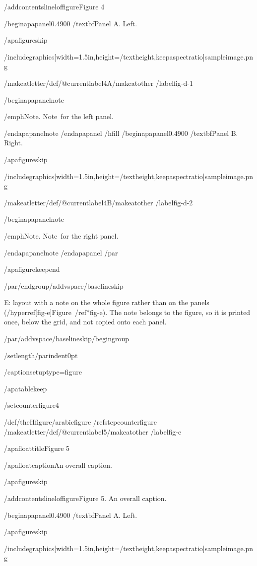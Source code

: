 /addcontentsline{lof}{figure}{Figure 4}

/begin{apapanel}{0.4900}%
/textbf{Panel A}. Left.

/apafigureskip

/includegraphics[width=1.5in,height=/textheight,keepaspectratio]{sampleimage.png}

/makeatletter/def/@currentlabel{4A}/makeatother%
/label{fig-d-1}

/begin{apapanelnote}

/emph{Note}. Note~for the left panel.

/end{apapanelnote}
/end{apapanel}%
/hfill
/begin{apapanel}{0.4900}%
/textbf{Panel B}. Right.

/apafigureskip

/includegraphics[width=1.5in,height=/textheight,keepaspectratio]{sampleimage.png}

/makeatletter/def/@currentlabel{4B}/makeatother%
/label{fig-d-2}

/begin{apapanelnote}

/emph{Note}. Note~for the right panel.

/end{apapanelnote}
/end{apapanel}%
/par

/apafigurekeepend

/par/endgroup/addvspace{/baselineskip}

E: layout with a note on the whole figure rather than on the panels
(/hyperref[fig-e]{Figure~/ref*{fig-e}}). The note belongs to the figure,
so it is printed once, below the grid, and not copied onto each panel.

/par/addvspace{/baselineskip}/begingroup

/setlength{/parindent}{0pt}

/captionsetup{type=figure}

/apatablekeep

/setcounter{figure}{4}

/def/theHfigure{/arabic{figure}}%
/refstepcounter{figure}%
/makeatletter/def/@currentlabel{5}/makeatother%
/label{fig-e}

/apafloattitle{Figure 5}

/apafloatcaption{An overall caption.}

/apafigureskip

/addcontentsline{lof}{figure}{Figure 5. An overall caption.}

/begin{apapanel}{0.4900}%
/textbf{Panel A}. Left.

/apafigureskip

/includegraphics[width=1.5in,height=/textheight,keepaspectratio]{sampleimage.png}

